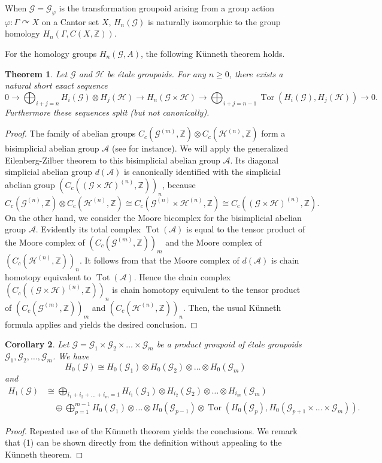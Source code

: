 \documentclass[11pt]{article}
\newtheorem{theorem}{Theorem}[section]
\newtheorem{corollary}[theorem]{Corollary}
\theoremstyle{definition}
\numberwithin{equation}{section}
\renewcommand{\phi}{\varphi}
\newcommand{\Tor}{\operatorname{Tor}}
\newcommand{\Tot}{\operatorname{Tot}}
\newcommand{\G}{\mathcal{G}}
\renewcommand{\H}{\mathcal{H}}
\newcommand{\Z}{\mathbb{Z}}
\begin{document}
When $\G=\G_\phi$ is the transformation groupoid 
arising from a group action $\phi:\Gamma\curvearrowright X$ 
on a Cantor set $X$, 
$H_n(\G)$ is naturally isomorphic to the group homology $H_n(\Gamma,C(X,\Z))$. 

For the homology groups $H_n(\G,A)$, the following K\"unneth theorem holds. 

\begin{theorem}\label{Kunneth}
Let $\G$ and $\H$ be \'etale groupoids. 
For any $n\geq0$, there exists a natural short exact sequence 
\[
0\longrightarrow\bigoplus_{i+j=n}H_i(\G)\otimes H_j(\H)
\longrightarrow H_n(\G\times\H)
\longrightarrow\bigoplus_{i+j=n-1}\Tor(H_i(\G),H_j(\H))\longrightarrow0. 
\]
Furthermore these sequences split (but not canonically). 
\end{theorem}
\begin{proof}
The family of abelian groups $C_c(\G^{(m)},\Z)\otimes C_c(\H^{(n)},\Z)$ 
form a bisimplicial abelian group $\mathcal{A}$ 
(see \cite[Chapter IV.2.2]{GJtext} for instance). 
We will apply the generalized Eilenberg-Zilber theorem 
\cite[Theorem IV.2.4]{GJtext} 
to this bisimplicial abelian group $\mathcal{A}$. 
Its diagonal simplicial abelian group $d(\mathcal{A})$ is 
canonically identified 
with the simplicial abelian group $(C_c((\G\times\H)^{(n)},\Z))_n$, 
because 
\[
C_c(\G^{(n)},\Z)\otimes C_c(\H^{(n)},\Z)
\cong C_c(\G^{(n)}\times\H^{(n)},\Z)\cong C_c((\G\times\H)^{(n)},\Z). 
\]
On the other hand, 
we consider the Moore bicomplex 
for the bisimplicial abelian group $\mathcal{A}$. 
Evidently its total complex $\Tot(\mathcal{A})$ is equal to 
the tensor product of the Moore complex of $(C_c(\G^{(m)},\Z))_m$ and 
the Moore complex of $(C_c(\H^{(n)},\Z))_n$. 
It follows from \cite[Theorem IV.2.4]{GJtext} that 
the Moore complex of $d(\mathcal{A})$ is 
chain homotopy equivalent to $\Tot(\mathcal{A})$. 
Hence the chain complex $(C_c((\G\times\H)^{(n)},\Z))_n$ is 
chain homotopy equivalent to 
the tensor product of $(C_c(\G^{(m)},\Z))_m$ and $(C_c(\H^{(n)},\Z))_n$. 
Then, 
the usual K\"unneth formula applies and yields the desired conclusion. 
\end{proof}

\begin{corollary}\label{H1ofprod}
Let $\G=\G_1\times \G_2\times\dots\times\G_m$ be a product groupoid of 
\'etale groupoids $\G_1,\G_2,\dots,\G_m$. 
We have 
\[
H_0(\G)\cong H_0(\G_1)\otimes H_0(\G_2)\otimes\dots\otimes H_0(\G_m)
\]
and 
\begin{align*}
H_1(\G)&\cong\bigoplus_{i_1+i_2+\dots+i_m=1}
H_{i_1}(\G_1)\otimes H_{i_2}(\G_2)\otimes\dots\otimes H_{i_m}(\G_m)\\
&\quad\oplus\bigoplus_{p=1}^{m-1}
H_0(\G_1)\otimes\dots\otimes H_0(\G_{p-1})
\otimes\Tor(H_0(\G_p),H_0(\G_{p+1}\times\dots\times \G_m)). 
\end{align*}
\end{corollary}
\begin{proof}
Repeated use of the K\"unneth theorem yields the conclusions. 
We remark that (1) can be shown directly from the definition 
without appealing to the K\"unneth theorem. 
\end{proof}
\end{document}
